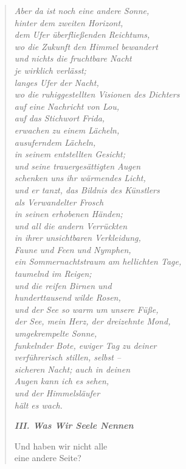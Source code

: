 \begin{verse}
{\itshape
Aber da ist noch eine andere Sonne,\\
hinter dem zweiten Horizont,\\
dem Ufer überfließenden Reichtums,\\
wo die Zukunft den Himmel bewandert\\
und nichts die fruchtbare Nacht\\
je wirklich verlässt;\\
langes Ufer der Nacht,\\
wo die ruhiggestellten Visionen des Dichters\\
auf eine Nachricht von Lou,\\
auf das Stichwort {\upshape Frida},\\
erwachen zu einem Lächeln,\\
ausuferndem Lächeln,\\
in seinem entstellten Gesicht;\\
und seine trauergesättigten Augen\\
schenken uns ihr wärmendes Licht,\\
und er tanzt, das {\upshape Bildnis des Künstlers}\\
als Verwandelter Frosch\\
in seinen erhobenen Händen;\\
und all die andern Verrückten\\
in ihrer unsichtbaren Verkleidung,\\
Faune und Feen und Nymphen,\\
ein Sommernachtstraum am hellichten Tage,\\
taumelnd im Reigen;\\
und die reifen Birnen und\\
hunderttausend wilde Rosen,\\
und der See so warm um unsere Füße,\\
der See, mein Herz, der dreizehnte Mond,\\
umgekrempelte Sonne,\\
funkelnder Bote, ewiger Tag zu deiner\\
verführerisch stillen, selbst --\\
sicheren Nacht; auch in deinen\\
Augen kann ich es sehen,\\
und der Himmelsläufer\\
hält es wach.}

{\bfseries\itshape III. Was Wir Seele Nennen}

Und haben wir nicht alle\\
eine andere Seite?


\end{verse}
